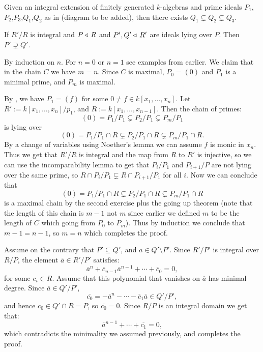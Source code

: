 \documentclass[11pt,a4paper]{article}
\begin{document}
\begin{exercise}
  \label{ex:dim-two}
  Given an integral extension of finitely generated $k$-algebras
  and prime ideals $P_1$,$P_2$,$P_3$,$Q_1$,$Q_2$ as in (diagram to be added),
  then there exists $Q_1 \subsetneq Q_2 \subsetneq Q_3$.
\end{exercise}

\begin{lemma}
  \label{lem:incomparability-lemma}
  If $R'/R$ is integral and $P \triangleleft\, R$ and $P',Q' \triangleleft\, R'$
  are ideals lying over $P$.
  Then $P' \supsetneq Q'$.
\end{lemma}

\begin{proofof}{}
  By induction on $n$.
  For $n = 0$ or $n = 1$ see examples from earlier. %
  We claim that in the chain $C$ we have $m = n$.
  Since $C$ is maximal, $P_0 = (0)$ and $P_1$ is a minimal prime,
  and $P_m$ is maximal.

  By , we have $P_1 = (f)$
  for some $0 \neq f \in k[x_1,\dots,x_n]$.
  Let $R' := k[x_1,\dots,x_n]/p_1$,
  and $R := k[x_1,\dots,x_{n-1}]$.
  Then the chain of primes:
  \[
    (0) = P_1/P_1 \subsetneq P_2/P_1 \subsetneq P_m/P_1
  \]
  is lying over
  \[
    (0) = P_1/P_1 \cap R \subsetneq P_2/P_1 \cap R \subsetneq P_m/P_1 \cap R.
  \]
  By a change of variables using  Noether's lemma
  we can assume $f$ is monic in $x_n$.
  Thus we get that $R'/R$ is integral and the map from $R$ to $R'$ is injective,
  so we can use the incomparability lemma to get that $P_i/P_1$ and $P_{i+1}/P$
  are not lying over the same prime, so $R \cap P_i/P_1 \subsetneq R \cap P_{i+1}/P_1$
  for all $i$.
  Now we can conclude that
  \[
    (0) = P_1/P_1 \cap R \subsetneq P_2/P_1 \cap R \subsetneq P_m/P_1 \cap R
  \]
  is a maximal chain by the second exercise plus the going up theorem
  (note that the length of this chain is $m-1$ not $m$ since earlier we defined
  $m$ to be the length of $C$ which going from $P_0$ to $P_m$).
  Thus by induction we conclude that $m - 1 = n - 1$,
  so $m = n$ which completes the proof.
\end{proofof}

\begin{proofof}{}
  Assume on the contrary that $P' \subseteq Q'$,
  and $a \in Q' \setminus P'$.
  Since $R'/P'$ is integral over $R/P$,
  the element $\overline a \in R'/P'$ satisfies:
  \[
  \overline a^n + \overline{c}_{n-1} \overline a^{n-1} + \cdots +
    \overline c_0 = 0,
  \]
  for some $c_i \in R$.
  Assume that this polynomial that vanishes on $\overline a$
  has minimal degree.
  Since $\overline a \in Q'/P'$,
  \[
    \overline{c_0} =
    - \overline a^n - \cdots - \overline{c}_1 \overline a \in Q'/P',
  \]
  and hence $c_0 \in Q' \cap R = P$, so $\overline{c_0} = 0$.
  Since $R/P$ is an integral domain we get that:
  \[
    \overline a^{n-1} + \cdots + \overline{c_1} = 0,
  \]
  which contradicts the minimality we assumed previously,
  and completes the proof.
\end{proofof}
\end{document}

